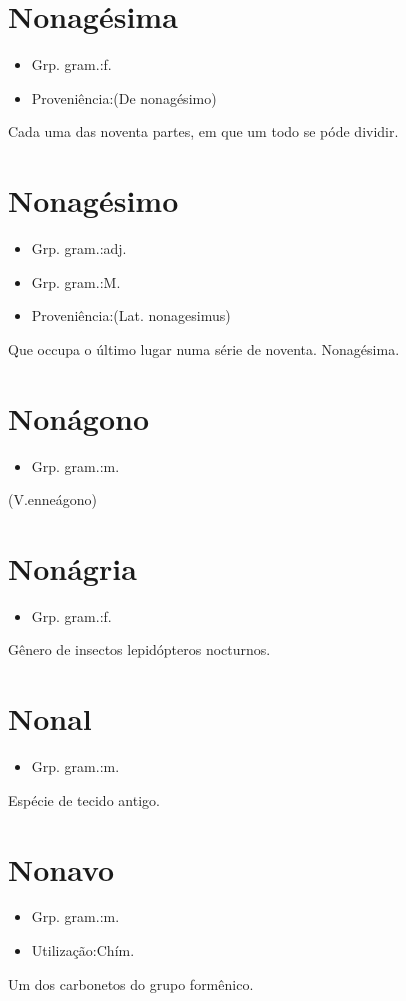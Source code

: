 \section{Nonagésima}
\begin{itemize}
\item {Grp. gram.:f.}
\end{itemize}
\begin{itemize}
\item {Proveniência:(De \textunderscore nonagésimo\textunderscore )}
\end{itemize}
Cada uma das noventa partes, em que um todo se póde dividir.
\section{Nonagésimo}
\begin{itemize}
\item {Grp. gram.:adj.}
\end{itemize}
\begin{itemize}
\item {Grp. gram.:M.}
\end{itemize}
\begin{itemize}
\item {Proveniência:(Lat. \textunderscore nonagesimus\textunderscore )}
\end{itemize}
Que occupa o último lugar numa série de noventa.
Nonagésima.
\section{Nonágono}
\begin{itemize}
\item {Grp. gram.:m.}
\end{itemize}
(V.enneágono)
\section{Nonágria}
\begin{itemize}
\item {Grp. gram.:f.}
\end{itemize}
Gênero de insectos lepidópteros nocturnos.
\section{Nonal}
\begin{itemize}
\item {Grp. gram.:m.}
\end{itemize}
Espécie de tecido antigo.
\section{Nonavo}
\begin{itemize}
\item {Grp. gram.:m.}
\end{itemize}
\begin{itemize}
\item {Utilização:Chím.}
\end{itemize}
Um dos carbonetos do grupo formênico.
